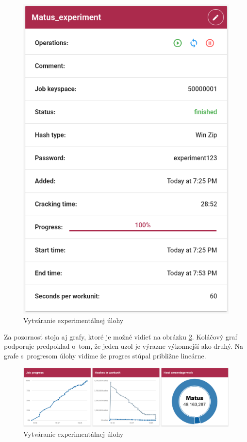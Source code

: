 \documentclass[slovak]{fitthesis}
\begin{document}
\begin{figure}[H]
    \centering
    \includegraphics[scale=0.6]{obrazky/exp2.PNG}
    \caption{Vytváranie experimentálnej úlohy}
    \label{fig:exp2}
\end{figure}
Za pozornosť stoja aj grafy, ktoré je možné vidieť na obrázku \ref{fig:exp3}. Koláčový graf podporuje predpoklad o~tom, že jeden uzol je výrazne výkonnejší ako druhý. Na grafe s~progresom úlohy vidíme že progres stúpal približne lineárne. 
\begin{figure}[H]
    \centering
    \includegraphics[scale=0.4]{obrazky/exp3.PNG}
    \caption{Vytváranie experimentálnej úlohy}
    \label{fig:exp3}
\end{figure}
\end{document}
